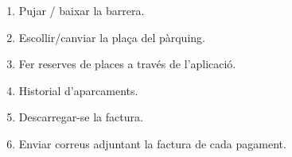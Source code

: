 \begin{slide}
    \begin{enumerate}
        \item Pujar / baixar la barrera.
        \item Escollir/canviar la plaça del pàrquing.
        \item Fer reserves de places a través de l'aplicació.
        \item Historial d'aparcaments.
        \item Descarregar-se la factura.
        \item Enviar correus adjuntant la factura de cada pagament.
    \end{enumerate}
\end{slide}